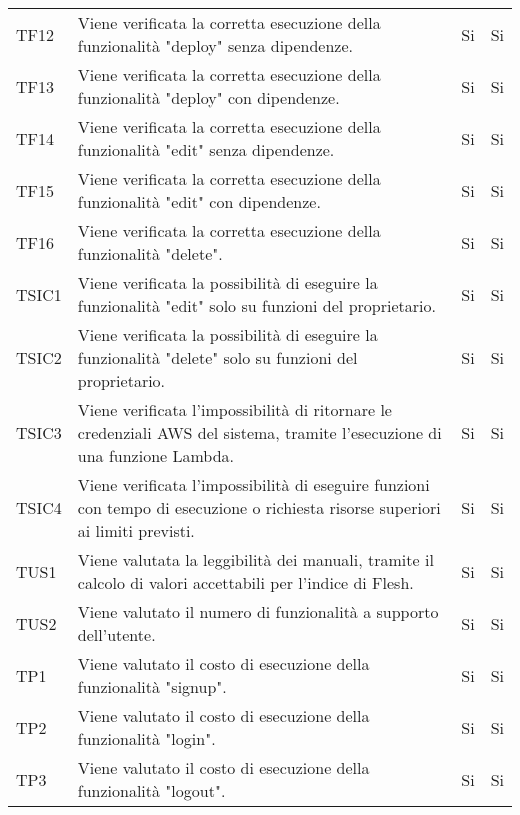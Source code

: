 \begin{longtable}{
		>{\centering}p{}
		>{}p{}
		>{\centering}p{}
		>{\centering}p{} }
		TF12 & Viene verificata la corretta esecuzione della funzionalità "deploy" senza dipendenze. &
		Si &
		Si \tabularnewline
		
		TF13 & Viene verificata la corretta esecuzione della funzionalità "deploy" con dipendenze. &
		Si &
		Si \tabularnewline
		
		TF14 & Viene verificata la corretta esecuzione della funzionalità "edit" senza dipendenze. &
		Si &
		Si \tabularnewline
		
		TF15 & Viene verificata la corretta esecuzione della funzionalità "edit" con dipendenze. &
		Si &
		Si \tabularnewline
		
		TF16 & Viene verificata la corretta esecuzione della funzionalità "delete". &
		Si &
		Si \tabularnewline
		
		
		
		
		TSIC1 & Viene verificata la possibilità di eseguire la funzionalità "edit" solo su funzioni del proprietario. &
		Si &
		Si \tabularnewline
		
		TSIC2 & Viene verificata la possibilità di eseguire la funzionalità "delete" solo su funzioni del proprietario. &
		Si &
		Si \tabularnewline
		
		TSIC3 & Viene verificata l'impossibilità di ritornare le credenziali AWS\ped{\textit{G}} del sistema, tramite l'esecuzione di una funzione Lambda\ped{\textit{G}}. &
		Si &
		Si \tabularnewline
		
		TSIC4 & Viene verificata l'impossibilità di eseguire funzioni con tempo di esecuzione o richiesta risorse superiori ai limiti previsti.  &
		Si &
		Si \tabularnewline
		
		
		
		
		
		
		TUS1 & Viene valutata la leggibilità dei manuali, tramite il calcolo di valori accettabili per l'indice di Flesh. &
		Si &
		Si \tabularnewline
		
		TUS2 & Viene valutato il numero di funzionalità a supporto dell'utente. &
		Si &
		Si \tabularnewline




		TP1 & Viene valutato il costo di esecuzione della funzionalità "signup". &
		Si &
		Si \tabularnewline
		
		TP2 & Viene valutato il costo di esecuzione della funzionalità "login". &
		Si &
		Si \tabularnewline
		
		TP3 & Viene valutato il costo di esecuzione della funzionalità "logout". &
		Si &
		Si \tabularnewline
		

\end{longtable}

